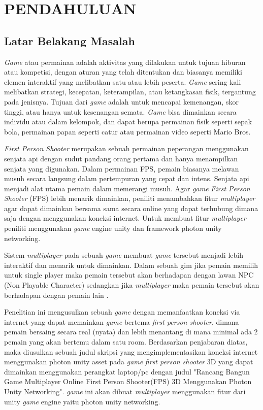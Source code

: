 \chapter{PENDAHULUAN}
\section{Latar Belakang Masalah}
\noindent

\textit{Game} atau permainan adalah aktivitas yang dilakukan untuk tujuan hiburan atau kompetisi, dengan aturan yang telah ditentukan dan biasanya memiliki elemen interaktif yang melibatkan satu atau lebih peserta. \textit{Game} sering kali melibatkan strategi, kecepatan, keterampilan, atau ketangkasan fisik, tergantung pada jenisnya. Tujuan dari \textit{game} adalah untuk mencapai kemenangan, skor tinggi, atau hanya untuk kesenangan semata. \textit{Game} bisa dimainkan secara individu atau dalam kelompok, dan dapat berupa permainan fisik seperti sepak bola, permainan papan seperti catur atau permainan video seperti Mario Bros\cite{fps}.

\textit{First Person Shooter} merupakan sebuah permainan peperangan menggunakan senjata api dengan sudut pandang orang pertama dan hanya menampilkan senjata yang digunakan.
Dalam permainan FPS, pemain biasanya melawan musuh secara langsung dalam pertempuran yang cepat dan intens\cite{fps}. Senjata api menjadi alat utama pemain dalam memerangi musuh.
Agar \textit{game} \textit{First Person Shooter} (FPS) lebih menarik dimainkan, peniliti menambahkan fitur \textit{multiplayer} agar dapat dimainkan bersama sama secara online yang dapat terhubung dimana saja dengan menggunakan koneksi internet. Untuk membuat fitur \textit{multiplayer} peniliti menggunakan \textit{game} engine unity dan framework photon unity networking.

Sistem \textit{multiplayer} pada sebuah \textit{\textit{game}} membuat \textit{\textit{game}} tersebut menjadi lebih interaktif dan menarik untuk dimainkan. Dalam sebuah gim jika pemain memilih untuk single player maka pemain tersebut akan berhadapan dengan lawan NPC (Non Playable Character) sedangkan jika \textit{multiplayer} maka pemain tersebut akan berhadapan dengan pemain lain \cite{Sarwodi}.


Penelitian ini mengusulkan sebuah \textit{\textit{game}} dengan memanfaatkan koneksi via internet yang dapat memainkan \textit{\textit{game}} bertema \textit{first person shooter}, dimana pemain bersaing secara real (nyata) dan lebih menantang di mana minimal ada 2 pemain yang akan bertemu dalam satu room.
Berdasarkan penjabaran diatas, maka diusulkan sebuah judul skripsi yang mengimplementasikan koneksi internet menggunakan photon unity asset pada \textit{\textit{game}} \textit{first person shooter} 3D yang dapat dimainkan menggunakan perangkat laptop/pc dengan judul "Rancang Bangun Game Multiplayer Online First Person Shooter(FPS) 3D Menggunakan Photon Unity Networking".
\textit{\textit{game}} ini akan dibuat \textit{multiplayer} menggunakan fitur dari unity \textit{\textit{game}} engine yaitu photon unity networking.

